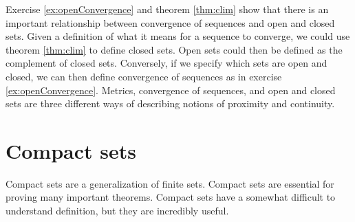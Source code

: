 Exercise \ref{ex:openConvergence} and theorem \ref{thm:clim} show that
there is an important relationship between convergence of sequences
and open and closed sets. Given a definition of what it means for a
sequence to converge, we could use theorem \ref{thm:clim} to define
closed sets. Open sets could then be defined as the complement of
closed sets. Conversely, if we specify which sets are open and closed,
we can then define convergence of sequences as in exercise
\ref{ex:openConvergence}. Metrics, convergence of sequences, and open
and closed sets are three different ways of describing notions of
proximity and continuity.

\section{Compact sets}

Compact sets are a generalization of finite sets. Compact sets are
essential for proving many important theorems. Compact sets have a
somewhat difficult to understand definition, but they are incredibly
useful.

